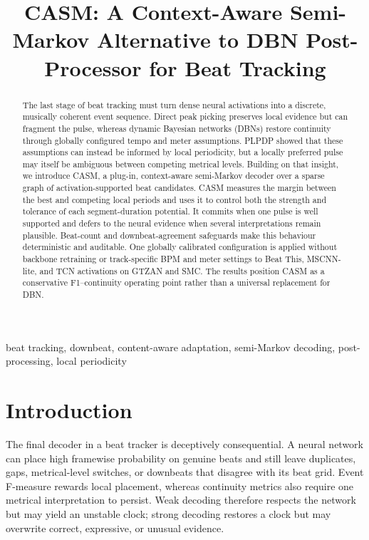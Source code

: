 \documentclass{article}
\title{CASM: A Context-Aware Semi-Markov Alternative to DBN Post-Processor for Beat Tracking}
\begin{document}
\ninept
\maketitle

\begin{abstract}
The last stage of beat tracking must turn dense neural activations into a
discrete, musically coherent event sequence. Direct peak picking preserves
local evidence but can fragment the pulse, whereas dynamic Bayesian networks
(DBNs) restore continuity through globally configured tempo and meter
assumptions. PLPDP showed that these assumptions can instead be informed by
local periodicity, but a locally preferred pulse may itself be ambiguous
between competing metrical levels. Building on that insight, we introduce
CASM, a plug-in, context-aware semi-Markov decoder over a sparse graph of
activation-supported beat candidates. CASM measures the margin between the
best and competing local periods and uses it to control both the strength and
tolerance of each segment-duration potential. It commits when one pulse is
well supported and defers to the neural evidence when several interpretations
remain plausible. Beat-count and downbeat-agreement safeguards make this
behaviour deterministic and auditable. One globally calibrated configuration
is applied without backbone retraining or track-specific BPM and meter settings
to Beat This, MSCNN-lite, and TCN activations on GTZAN and SMC. The results
position CASM as a conservative F1--continuity operating point rather than a
universal replacement for DBN.
\end{abstract}

\begin{keywords}
beat tracking, downbeat, content-aware adaptation, semi-Markov decoding, post-processing, local periodicity
\end{keywords}

\section{Introduction}
\label{sec:intro}

The final decoder in a beat tracker is deceptively consequential. A neural
network can place high framewise probability on genuine beats and still leave
duplicates, gaps, metrical-level switches, or downbeats that disagree with its
beat grid. Event F-measure rewards local placement, whereas continuity metrics
also require one metrical interpretation to persist. Weak decoding therefore
respects the network but may yield an unstable clock; strong decoding restores
a clock but may overwrite correct, expressive, or unusual evidence.
\end{document}
